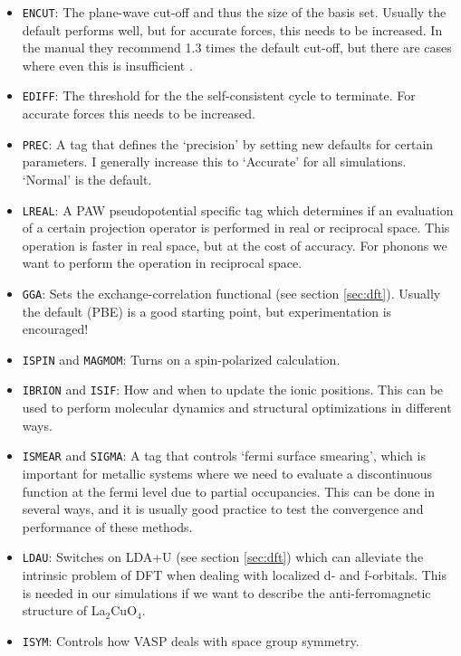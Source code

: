 \begin{itemize}
	\item \texttt{ENCUT}: The plane-wave cut-off and thus the size of the basis set. Usually the default performs well, but for accurate forces, this needs to be increased. In the manual they recommend 1.3 times the default cut-off, but there are cases where even this is insufficient \cite{DaSilva2015}.
	\item \texttt{EDIFF}: The threshold for the the self-consistent cycle to terminate. For accurate forces this needs to be increased.
	\item \texttt{PREC}: A tag that defines the `precision' by setting new defaults for certain parameters. I generally increase this to `Accurate' for all simulations. `Normal' is the default.
	\item \texttt{LREAL}: A PAW pseudopotential specific tag which determines if an evaluation of a certain projection operator is performed in real or reciprocal space. This operation is faster in real space, but at the cost of accuracy. For phonons we want to perform the operation in reciprocal space.
	\item \texttt{GGA}: Sets the exchange-correlation functional (see section \ref{sec:dft}). Usually the default (PBE) is a good starting point, but experimentation is encouraged!
	\item \texttt{ISPIN} and \texttt{MAGMOM}: Turns on a spin-polarized calculation.
	\item \texttt{IBRION} and \texttt{ISIF}: How and when to update the ionic positions. This can be used to perform molecular dynamics and structural optimizations in different ways.
	\item \texttt{ISMEAR} and \texttt{SIGMA}: A tag that controls `fermi surface smearing', which is important for metallic systems where we need to evaluate a discontinuous function at the fermi level due to partial occupancies. This can be done in several ways, and it is usually good practice to test the convergence and performance of these methods.
	\item \texttt{LDAU}: Switches on LDA+U (see section \ref{sec:dft}) which can alleviate the intrinsic problem of DFT when dealing with localized d- and f-orbitals. This is needed in our simulations if we want to describe the anti-ferromagnetic structure of La$_2$CuO$_4$.
	\item \texttt{ISYM}: Controls how VASP deals with space group symmetry. 
\end{itemize}

